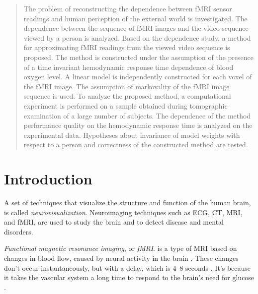 \documentclass{article}
\begin{document}
\maketitle

\begin{abstract}

The problem of reconstructing the dependence between fMRI sensor readings 
and human perception of the external world is investigated. 
The dependence between the sequence of fMRI images and the video sequence 
viewed by a person is analyzed. Based on the dependence study, a method for 
approximating fMRI readings from the viewed video sequence is proposed. 
The method is constructed under the assumption of the presence of a time 
invariant hemodynamic response time dependence of blood oxygen level. 
A linear model is independently constructed for each voxel of the fMRI image.  
The assumption of markovality of the fMRI image sequence is used. 
To analyze the proposed method, a computational experiment is performed 
on a sample obtained during tomographic examination of a large number of subjects. 
The dependence of the method performance quality on the hemodynamic response 
time is analyzed on the experimental data. Hypotheses about invariance of 
model weights with respect to a person and correctness of the constructed 
method are tested.

\end{abstract}



\section{Introduction}

A set of techniques that visualize the structure and function of the human brain,
is called \textit{neurovisualization}. Neuroimaging \citep{puras2014neurovisualization} techniques such as ECG, CT, MRI, and fMRI,
are used to study the brain and to detect disease and mental disorders.

\textit{Functional magnetic resonance imaging}, or \textit{fMRI}.
is a type of MRI based on changes in blood flow,
caused by neural activity in the brain \citep{Glover2011}.
These changes don't occur instantaneously, but with a delay,
which is 4--8 seconds \citep{Bandettini1992}.
It's because it takes the vascular system a long time to respond
to the brain's need for glucose \citep{Ogawa1990, LEBIHAN1995231, Logothetis2003}. 
\end{document}
